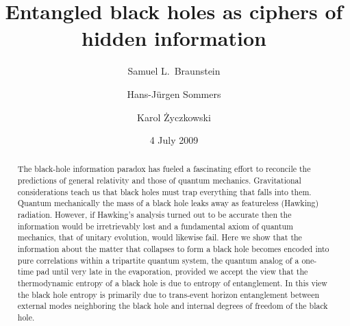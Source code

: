 \documentclass[aps,prl,amsmath,amssymb,floatfix,12pt]{revtex4}
\begin{document}
\title{Entangled black holes as ciphers of hidden information}

\author{Samuel L.\ Braunstein}
\author{Hans-J\"urgen Sommers}
\author{Karol \.{Z}yczkowski}

\date{4 July 2009}

\begin{abstract}
\noindent
\baselineskip 13pt
The black-hole information paradox has fueled a fascinating effort to
reconcile the predictions of general relativity and those of quantum
mechanics. Gravitational considerations teach us that black holes must
trap everything that falls into them. Quantum mechanically the mass of
a black hole leaks away as featureless (Hawking) radiation.
However, if Hawking's analysis turned out to be accurate then the
information would be irretrievably lost and a fundamental axiom of
quantum mechanics, that of unitary evolution, would likewise
fail. Here we show that the information about the
matter that collapses to form a black hole becomes encoded into pure
correlations within a tripartite quantum system, the quantum analog
of a one-time pad until very late in the evaporation,
provided we accept the view that the thermodynamic entropy of a black
hole is due to entropy of entanglement.
In this view the black hole entropy is primarily due to trans-event
horizon entanglement between external modes neighboring the black hole
and internal degrees of freedom of the black hole.
\end{abstract}

\maketitle

\section{}
\end{document}
